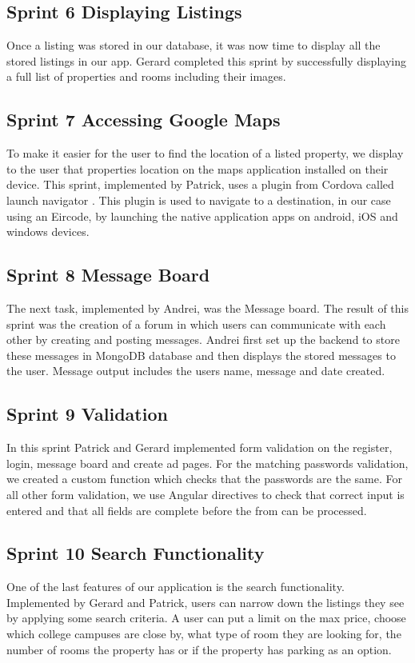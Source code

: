 \subsection{Sprint 6 Displaying Listings}
Once a listing was stored in our database, it was now time to display all the stored listings in our app. Gerard completed this sprint by successfully displaying a full list of properties and rooms including their images.

\subsection{Sprint 7 Accessing Google Maps}
To make it easier for the user to find the location of a listed property, we display to the user that properties location on the maps application installed on their device. This sprint, implemented by Patrick, uses a plugin from Cordova called launch navigator \cite{LaunchNav}. This plugin is used to navigate to a destination, in our case using an Eircode, by launching the native application apps on android, iOS and windows devices.

\subsection{Sprint 8 Message Board }
The next task, implemented by Andrei, was the Message board. The result of this sprint was the creation of a forum in which users can communicate with each other by creating and posting messages. Andrei first set up the backend to store these messages in MongoDB database and then displays the stored messages to the user. Message output includes the users name, message and date created.

\subsection{Sprint 9 Validation}
In this sprint Patrick and Gerard implemented form validation on the register, login, message board and create ad pages. For the matching passwords validation, we created a custom function which checks that the passwords are the same. For all other form validation, we use Angular directives to check that correct input is entered and that all fields are complete before the from can be processed. 

\subsection{Sprint 10 Search Functionality}
One of the last features of our application is the search functionality. Implemented by Gerard and Patrick, users can narrow down the listings they see by applying some search criteria. A user can put a limit on the max price, choose which college campuses are close by, what type of room they are looking for, the number of rooms the property has or if the property has parking as an option.


